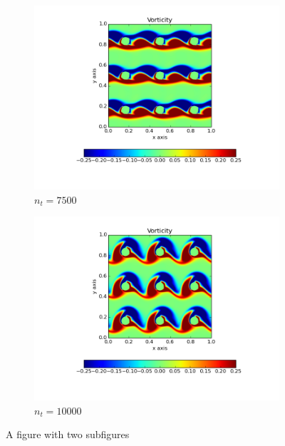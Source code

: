 \documentclass[10pt, a4paper]{article}
\begin{document}
\begin{figure}[htb!]
\begin{subfigure}{.5\textwidth}
  \includegraphics[width=1.1\linewidth, clip=true, trim=1cm 1cm 1cm 1cm]{q1_0003}
  \caption{$n_t = 7500$}
  \label{fig:sub1}
\end{subfigure}%
\begin{subfigure}{.5\textwidth}
  \centering
  \includegraphics[width=1.1\linewidth, clip=true, trim=1cm 1cm 1cm 1cm]{q1_0004}
  \caption{$n_t = 10000$}
  \label{fig:sub2}
\end{subfigure}
\caption{A figure with two subfigures}
\label{fig:test}
\end{figure}

\newpage
\end{document}
